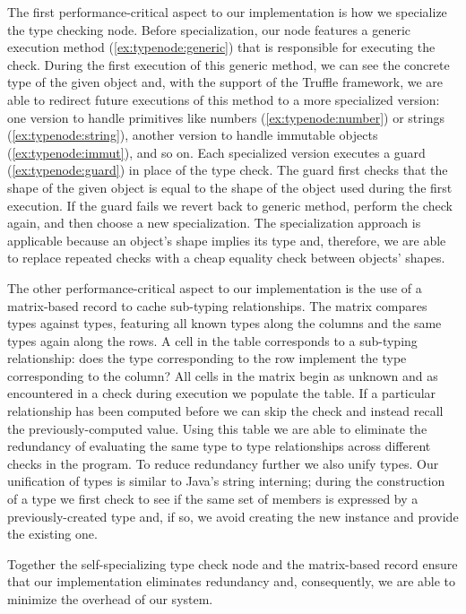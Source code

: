 The first performance-critical aspect to our implementation
is how we specialize the type checking node.
Before specialization,
our node features a generic execution method
(\cref{ex:typenode:generic})
that is responsible for executing the check.
During the first execution of this generic method,
we can see the concrete type of the given object and,
with the support of the Truffle framework,
we are able to redirect future executions of this method
to a more specialized version:
one version to handle primitives like
numbers (\cref{ex:typenode:number}) or strings (\cref{ex:typenode:string}),
another version to handle immutable objects (\cref{ex:typenode:immut}),
and so on.
Each specialized version executes a guard (\cref{ex:typenode:guard})
in place of the type check.
The guard first checks that the shape of the given object
is equal to the shape of the object
used during the first execution.
If the guard fails
we revert back to generic method,
perform the check again,
and then choose a new specialization.
The specialization approach is applicable because
an object's shape implies its type and, therefore,
we are able to replace repeated checks
with a cheap equality check between objects' shapes.

The other performance-critical aspect to our implementation
is the use of a matrix-based record to cache sub-typing relationships.
The matrix compares types against types,
featuring all known types along the columns and the same types again along the rows.
A cell in the table corresponds to a sub-typing relationship:
does the type corresponding to the row implement
the type corresponding to the column?
All cells in the matrix begin as unknown and as 
encountered in a check during execution
we populate the table.
If a particular relationship has been computed before
we can skip the check and instead recall the previously-computed value.
Using this table we are able to eliminate the redundancy of evaluating
the same type to type relationships across different checks in the program. To reduce redundancy further we also unify types.
Our unification of types is similar to Java's string interning; 
during the construction of a type we first check to see if the same
set of members is expressed by a previously-created type and, if so,
we avoid creating the new instance and provide the existing one.

Together the self-specializing type check node and the matrix-based record
ensure that our implementation eliminates redundancy and,
consequently, we are able to minimize the overhead of our system. 

